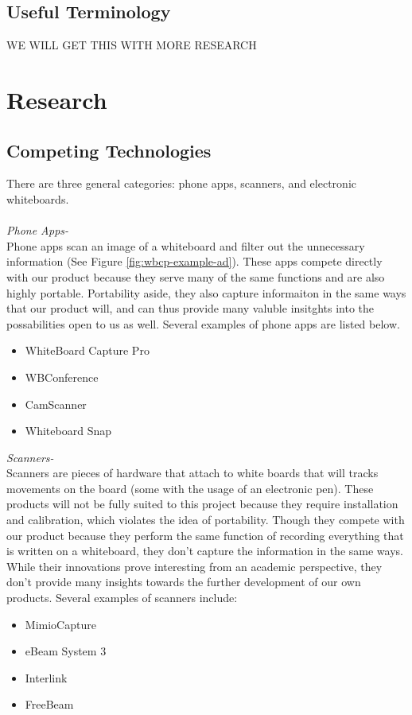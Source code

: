 \documentclass{article}
\begin{document}
		\subsection*{Useful Terminology}
			WE WILL GET THIS WITH MORE RESEARCH
	
	\section{Research}
		\subsection*{Competing Technologies}
			There are three general categories: phone apps, scanners, and electronic whiteboards.\\
			\\
			\emph{Phone Apps-}\\
Phone apps scan an image of a whiteboard and filter out the unnecessary information (See Figure \ref{fig:wbcp-example-ad}). These apps compete directly with our product because they serve many of the same functions and are also highly portable. Portability aside, they also capture informaiton in the same ways that our product will, and can thus provide many valuble insitghts into the possabilities open to us as well. Several examples of phone apps are listed below.

			\begin{itemize}
				\item WhiteBoard Capture Pro
				\item WBConference
				\item CamScanner
				\item Whiteboard Snap
			\end{itemize} 
			
			
			\noindent \emph{Scanners-}\\
Scanners are pieces of hardware that attach to white boards that will tracks movements on the board (some with the usage of an electronic pen). These products will not be fully suited to this project because they require installation and calibration, which violates the idea of portability. Though they compete with our product because they perform the same function of recording everything that is written on a whiteboard, they don't capture the information in the same ways. While their innovations prove interesting from an academic perspective, they don't provide many insights towards the further development of our own products. Several examples of scanners include:
			\begin{itemize}
				\item MimioCapture
				\item eBeam System 3
				\item Interlink
				\item FreeBeam
			\end{itemize}
			
\end{document}
